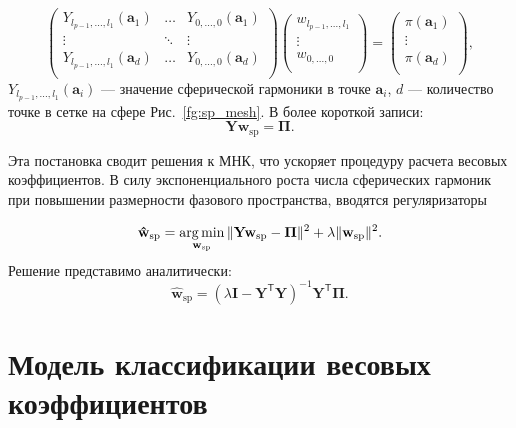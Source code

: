 \documentclass[12pt,twoside]{article}
\begin{document}
\begin{equation}
\begin{pmatrix} 
	{Y}_{l_{p-1},...,l_1}({\mathbf{a}}_1) & \ldots & {Y}_{0,...,0}({\mathbf{a}}_1)\\
	\vdots& \ddots & \vdots\\
	{Y}_{l_{p-1},...,l_1}({\mathbf{a}}_d) & \ldots & {Y}_{0,...,0}({\mathbf{a}}_d)\\
\end{pmatrix}
\begin{pmatrix} 
	w_{l_{p-1},...,l_1}\\
	\vdots\\
	w_{0,...,0}\\
\end{pmatrix}
=
\begin{pmatrix} 
	\pi(\mathbf{a}_1)\\
	\vdots\\
	\pi(\mathbf{a}_d)\\
\end{pmatrix},
\label{eq:sp_app_matrix}
\end{equation}
 $Y_{l_{p-1},...,l_1}({\mathbf{a}}_i)$ --- значение сферической гармоники в точке ${\mathbf{a}}_i$, $d$ --- количество точке в сетке на сфере Рис.~\ref{fg:sp_mesh}.
В более короткой записи:
\begin{equation}
\mathbf{{Y}}\mathbf{w}_{\text{sp}} = \mathbf{\Pi}.
\label{eq:sp_app_matrix_short}
\end{equation}

Эта постановка сводит решения к МНК, что ускоряет процедуру расчета весовых коэффициентов.
В силу экспоненциального роста числа сферических гармоник при повышении размерности фазового пространства, вводятся регуляризаторы

\begin{equation}
    \mathbf{\hat{w}}_{\text{sp}} = \argmin_{\mathbf{w}_{\text{sp}}}
    \|\mathbf{{Y}}\mathbf{w}_{\text{sp}} - \mathbf{\Pi}\|^2 + \lambda\|\mathbf{w}_{\text{sp}}\|^2.
\label{eq:arg_l2}
\end{equation}
Решение представимо аналитически:
\begin{equation}
    \mathbf{\hat{w}}_{\text{sp}} = (\lambda \mathbf{I} - \mathbf{{Y}}^{\mathsf{T}}\mathbf{{Y}})^{-1}\mathbf{{Y}}^{\mathsf{T}}\mathbf{\Pi}.
\label{eq:arg_l2_solution}
\end{equation}

\section{Модель классификации весовых коэффициентов}
\end{document}
